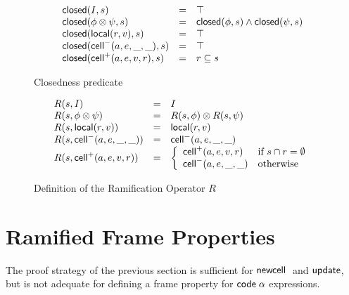 \begin{figure}
\mbox{}
  \begin{displaymath}
    \begin{array}{lcl}
      \mathsf{closed}({I}, {s}) & = & \top \\
      \mathsf{closed}({\phi \otimes \psi}, {s}) & = & \mathsf{closed}({\phi}, {s}) \land \mathsf{closed}({\psi}, {s}) \\ 
      \mathsf{closed}({\mathsf{local}({r}, {v})}, {s}) & = & \top \\
      \mathsf{closed}({\mathsf{cell}^{-}({a}, {e}, {\_}, {\_})}, {s}) & = & \top \\
      \mathsf{closed}({\mathsf{cell}^{+}({a}, {e}, {v}, {r})}, {s}) & = & r \subseteq s \\
    \end{array}
  \end{displaymath}
\caption{Closedness predicate}
\label{closedness}  
\end{figure}

\begin{figure}
\mbox{}
  \begin{displaymath}
    \begin{array}{lcl}
      R(s, I)                 & = & I \\
      R(s, \phi \otimes \psi) & = & R(s, \phi) \otimes R(s, \psi) \\
      R(s, \mathsf{local}({r}, {v}))   & = & \mathsf{local}({r}, {v}) \\
      R(s, \mathsf{cell}^{-}({a}, {e}, {\_}, {\_}))    & = & \mathsf{cell}^{-}({a}, {e}, {\_}, {\_}) \\
      R(s, \mathsf{cell}^{+}({a}, {e}, {v}, {r})) & = & \left\{\begin{array}{ll}
                                                \mathsf{cell}^{+}({a}, {e}, {v}, {r}) 
                                              & \mbox{if } s \cap r = \emptyset \\
                                                \mathsf{cell}^{-}({a}, {e}, {\_}, {\_})
                                              & \mbox{otherwise}
                                              \end{array}
                                       \right.
    \end{array}
  \end{displaymath}
\caption{Definition of the Ramification Operator $R$}
\label{ramify-def}
\end{figure}

\section{Ramified Frame Properties}

The proof strategy of the previous section is sufficient for
$\mathsf{newcell}\;$ and $\mathsf{update}$, but is not adequate for defining a frame
property for $\mathsf{code}\;{\alpha}$ expressions.

